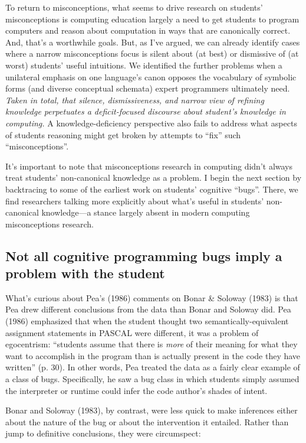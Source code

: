 To return to misconceptions, what seems to drive research on students'
misconceptions is computing education largely a need to get students to program computers
and reason about computation in ways that are canonically correct. And,
that's a worthwhile goals. But, as I've argued, we can
already identify cases where a narrow misconceptions focus is silent
about (at best) or dismissive of (at worst) students' useful intuitions. We identified
the further problems when a unilateral emphasis on one language's canon
opposes the vocabulary of symbolic forms (and diverse conceptual
schemata) expert programmers ultimately need. \emph{Taken in
total, that silence, dismissiveness, and narrow view of refining
knowledge perpetuates a deficit-focused discourse about student's
knowledge in computing.} A knowledge-deficiency perspective also fails to address what aspects of
students reasoning might get broken by attempts to ``fix'' such
``misconceptions''.

It's important to note that misconceptions research in computing didn't
always treat students' non-canonical knowledge as a problem. I begin the
next section by backtracing to some of the earliest work on students'
cognitive ``bugs''. There, we find researchers talking more explicitly
about what's useful in students' non-canonical knowledge---a stance
largely absent in modern computing misconceptions research.

\subsection{Not all cognitive programming bugs imply a problem with
the
student}\label{not-all-cognitive-programming-bugs-imply-a-problem-with-the-student}

What's curious about Pea's (1986) comments on Bonar \& Soloway (1983) is
that Pea drew different conclusions from the data than Bonar and Soloway
did. Pea (1986) emphasized that when the student thought two
semantically-equivalent assignment statements in PASCAL were different,
it was a problem of egocentrism: ``students assume that there is
\emph{more} of their meaning for what they want to accomplish in the
program than is actually present in the code they have written'' (p.
30). In other words, Pea treated the data as a fairly clear example of a
class of bugs. Specifically, he saw a bug class in which students simply
assumed the interpreter or runtime could infer the code author's shades
of intent.

Bonar and Soloway (1983), by contrast, were less quick to make
inferences either about the nature of the bug or about the intervention
it entailed. Rather than jump to definitive conclusions, they were
circumspect:

